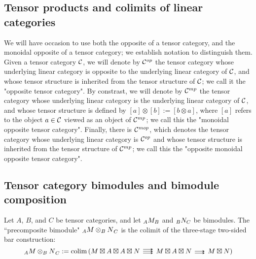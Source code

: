 \documentclass{amsart}
\begin{document}
\subsection{Tensor products and colimits of linear categories} \label{sec-tc-tensorprod}

\begin{definition}
\end{definition}

\begin{definition} \label{def-colim}
\end{definition}


We will have occasion to use both the opposite of a tensor category, and the monoidal opposite of a tensor category; we establish notation to distinguish them.  Given a tensor category $\mathcal C$, we will denote by $\mathcal C^{op}$ the tensor category whose underlying linear category is opposite to the underlying linear category of $\mathcal C$, and whose tensor structure is inherited from the tensor structure of $\mathcal C$; we call it the "opposite tensor category".  By constrast, we will denote by $\mathcal C^{mp}$ the tensor category whose underlying linear category is the underlying linear category of $\mathcal C$, and whose tensor structure is defined by $[a] \otimes [b] := [b \otimes a]$, where $[a]$ refers to the object $a \in \mathcal C$ viewed as an object of $\mathcal C^{mp}$; we call this the "monoidal opposite tensor category".  Finally, there is $\mathcal C^{mop}$, which denotes the tensor category whose underlying linear category is $\mathcal C^{op}$ and whose tensor structure is inherited from the tensor structure of $\mathcal C^{mp}$; we call this the "opposite monoidal opposite tensor category".

\subsection{Tensor category bimodules and bimodule composition} \label{sec-tc-bimod}


\begin{definition}
\end{definition}

\begin{definition}
Let $A$, $B$, and $C$ be tensor categories, and let ${}_{A} {M}_{B}$ and ${}_{B} {N}_{C}$ be bimodules.  The ``precomposite bimodule" ${}_{A} {M \otimes_B N}_{C}$ is the colimit of the three-stage two-sided bar construction:
\begin{equation} \nn
\bimod{A}{M \otimes_B N}{C} := \colim \left( M \dtimes A \dtimes A \dtimes N \righttriplearrows M \dtimes A \dtimes N \rightdoublearrows M \dtimes N \right)
\end{equation}
\end{definition}
\end{document}
